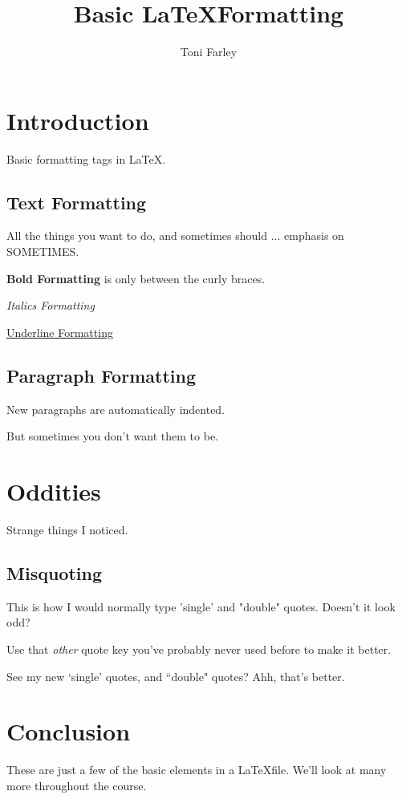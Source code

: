 \documentclass{article}
\title{Basic \LaTeX Formatting}
\author{Toni Farley}
\date{}
\begin{document}
\maketitle

\section{Introduction}

Basic formatting tags in \LaTeX.

\subsection{Text Formatting}

All the things you want to do, and sometimes should ... emphasis on SOMETIMES.

\textbf{Bold Formatting} is only between the curly braces.

\emph{Italics Formatting}

\underline{Underline Formatting}

\subsection{Paragraph Formatting}

New paragraphs are automatically indented.

\noindent But sometimes you don't want them to be.

\section{Oddities}

Strange things I noticed.

\subsection{Misquoting}

This is how I would normally type 'single' and "double" quotes. Doesn't it look odd?

\noindent Use that \emph{other} quote key you've probably never used before to make it better.

\noindent See my new `single' quotes, and ``double" quotes? Ahh, that's better.

\section{Conclusion}

These are just a few of the basic elements in a \LaTeX file. We'll look at many more throughout the course.
\end{document}
